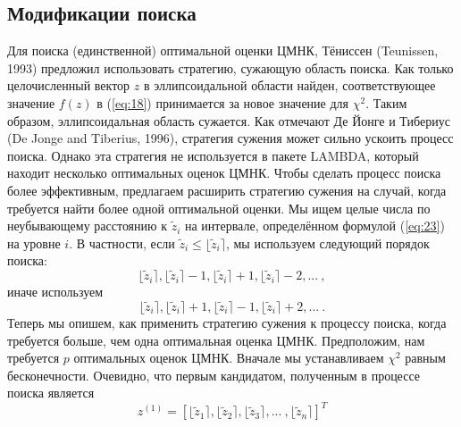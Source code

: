 \documentclass[12pt]{matmex-diploma}
\begin{document}
\subsection{Модификации поиска}
Для поиска (единственной) оптимальной оценки ЦМНК, Тёниссен (Teunissen, 1993) 
предложил использовать стратегию, сужающую область поиска. Как только целочисленный
вектор $z$ в эллипсоидальной области найден, соответствующее значение $f (z)$ в
(\ref{eq:18}) принимается за новое значение для $\chi^2$. Таким образом,
эллипсоидальная область сужается. Как отмечают Де Йонге и Тибериус (De Jonge
and Tiberius, 1996), стратегия сужения может сильно ускоить процесс поиска.
Однако эта стратегия не используется в пакете LAMBDA, который находит несколько
оптимальных оценок ЦМНК. Чтобы сделать процесс поиска более эффективным,
предлагаем расширить стратегию сужения на случай, когда требуется найти более одной
оптимальной оценки. 
Мы ищем целые числа по неубывающему расстоянию к $\tilde{z}_i$ на интервале,
определённом формулой (\ref{eq:23}) на уровне $i$. В частности, если
$\tilde{z}_i \leq \lfloor \tilde{z}_i \rceil$, мы используем следующий порядок поиска:
\begin{equation}
     \lfloor \tilde{z}_i \rceil, \lfloor \tilde{z}_i \rceil - 1,
     \lfloor \tilde{z}_i \rceil + 1, \lfloor \tilde{z}_i \rceil - 2, ... \ ,
     \label{eq:28}
\end{equation}
иначе используем
\begin{equation}
     \lfloor \tilde{z}_i \rceil, \lfloor \tilde{z}_i \rceil + 1,
     \lfloor \tilde{z}_i \rceil - 1, \lfloor \tilde{z}_i \rceil + 2, ... \ .
     \label{eq:29}
\end{equation}
Теперь мы опишем, как применить стратегию сужения к процессу поиска, когда
требуется больше, чем одна оптимальная оценка ЦМНК. Предположим, нам
требуется $p$ оптимальных оценок ЦМНК. Вначале мы устанавливаем $\chi^2$ равным
бесконечности. Очевидно, что первым кандидатом, полученным в процессе поиска
является
\begin{equation}
     z^{(1)} = \left[\lfloor \tilde{z}_1 \rceil, \lfloor \tilde{z}_2 \rceil,
     \lfloor \tilde{z}_3 \rceil, ... \ , \lfloor \tilde{z}_n \rceil\right]^T
     \label{eq:30}
\end{equation}
\end{document}
